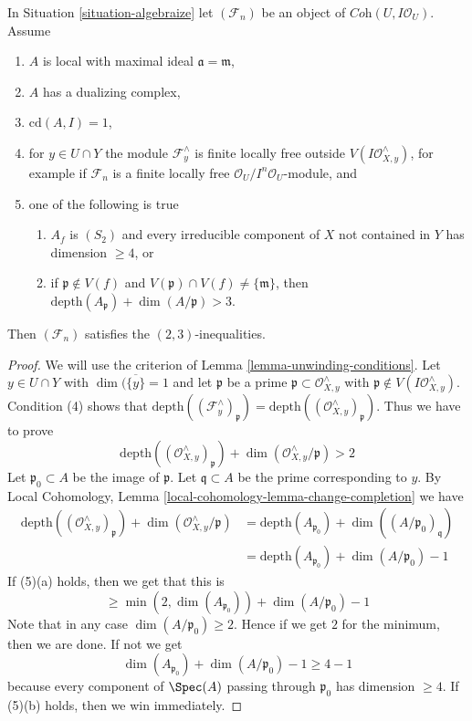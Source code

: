 \begin{lemma}
\label{lemma-unwinding-conditions-bis}
In Situation \ref{situation-algebraize} let $(\mathcal{F}_n)$ be an object
of $\textit{Coh}(U, I\mathcal{O}_U)$. Assume
\begin{enumerate}
\item $A$ is local with maximal ideal $\mathfrak a = \mathfrak m$,
\item $A$ has a dualizing complex,
\item $\text{cd}(A, I) = 1$,
\item for $y \in U \cap Y$ the module $\mathcal{F}_y^\wedge$
is finite locally free outside $V(I\mathcal{O}_{X, y}^\wedge)$,
for example if $\mathcal{F}_n$ is a finite locally free
$\mathcal{O}_U/I^n\mathcal{O}_U$-module, and
\item one of the following is true
\begin{enumerate}
\item $A_f$ is $(S_2)$ and every irreducible component of $X$
not contained in $Y$ has dimension $\geq 4$, or
\item if $\mathfrak p \not \in V(f)$ and
$V(\mathfrak p) \cap V(f) \not = \{\mathfrak m\}$, then
$\text{depth}(A_\mathfrak p) + \dim(A/\mathfrak p) > 3$.
\end{enumerate}
\end{enumerate}
Then $(\mathcal{F}_n)$ satisfies the $(2, 3)$-inequalities.
\end{lemma}

\begin{proof}
We will use the criterion of Lemma \ref{lemma-unwinding-conditions}.
Let $y \in U \cap Y$ with $\dim(\overline{\{y\}} = 1$ and let
$\mathfrak p$ be a prime $\mathfrak p \subset \mathcal{O}_{X, y}^\wedge$ with
$\mathfrak p \not \in V(I\mathcal{O}_{X, y}^\wedge)$.
Condition (4) shows that
$\text{depth}((\mathcal{F}_y^\wedge)_\mathfrak p) =
\text{depth}((\mathcal{O}_{X, y}^\wedge)_\mathfrak p)$.
Thus we have to prove
$$
\text{depth}((\mathcal{O}_{X, y}^\wedge)_\mathfrak p) +
\dim(\mathcal{O}_{X, y}^\wedge/\mathfrak p) > 2
$$
Let $\mathfrak p_0 \subset A$ be the image of $\mathfrak p$.
Let $\mathfrak q \subset A$ be the prime corresponding to $y$.
By Local Cohomology, Lemma
\ref{local-cohomology-lemma-change-completion}
we have
\begin{align*}
\text{depth}((\mathcal{O}_{X, y}^\wedge)_\mathfrak p) +
\dim(\mathcal{O}_{X, y}^\wedge/\mathfrak p)
& =
\text{depth}(A_{\mathfrak p_0}) + \dim((A/\mathfrak p_0)_\mathfrak q) \\
& =
\text{depth}(A_{\mathfrak p_0}) + \dim(A/\mathfrak p_0) - 1
\end{align*}
If (5)(a) holds, then we get that this is
$$
\geq \min(2, \dim(A_{\mathfrak p_0})) + \dim(A/\mathfrak p_0) - 1
$$
Note that in any case $\dim(A/\mathfrak p_0) \geq 2$. Hence if
we get $2$ for the minimum, then we are done. If not we get
$$
\dim(A_{\mathfrak p_0}) + \dim(A/\mathfrak p_0) - 1 \geq 4 - 1
$$
because every component of $\Spec(A)$ passing through $\mathfrak p_0$
has dimension $\geq 4$. If (5)(b) holds, then we win immediately.
\end{proof}


